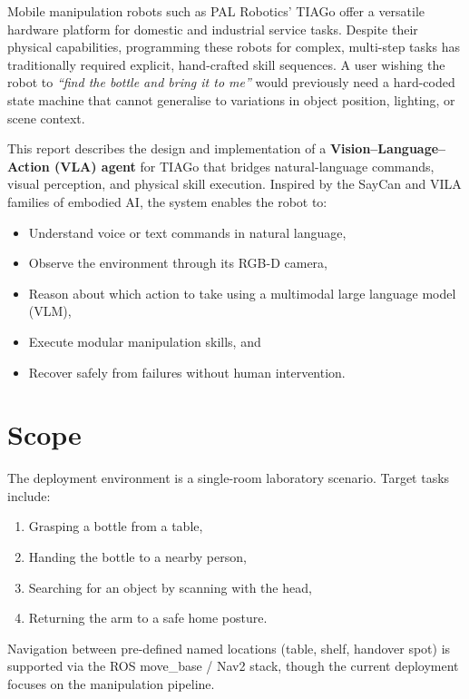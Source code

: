 \documentclass[12pt,a4paper]{report}
\begin{document}
Mobile manipulation robots such as PAL Robotics' TIAGo offer a versatile hardware platform
for domestic and industrial service tasks.  Despite their physical capabilities, programming
these robots for complex, multi-step tasks has traditionally required explicit, hand-crafted
skill sequences.  A user wishing the robot to \emph{``find the bottle and bring it to me''}
would previously need a hard-coded state machine that cannot generalise to variations in
object position, lighting, or scene context.

This report describes the design and implementation of a \textbf{Vision--Language--Action
(VLA) agent} for TIAGo that bridges natural-language commands, visual perception, and
physical skill execution.  Inspired by the SayCan \cite{saycancite} and VILA \cite{vilacite}
families of embodied AI, the system enables the robot to:

\begin{itemize}[noitemsep]
  \item Understand voice or text commands in natural language,
  \item Observe the environment through its RGB-D camera,
  \item Reason about which action to take using a multimodal large language model (VLM),
  \item Execute modular manipulation skills, and
  \item Recover safely from failures without human intervention.
\end{itemize}

\section{Scope}

The deployment environment is a single-room laboratory scenario.  Target tasks include:

\begin{enumerate}[noitemsep]
  \item Grasping a bottle from a table,
  \item Handing the bottle to a nearby person,
  \item Searching for an object by scanning with the head,
  \item Returning the arm to a safe home posture.
\end{enumerate}

Navigation between pre-defined named locations (table, shelf, handover spot) is supported
via the ROS move\_base / Nav2 stack, though the current deployment focuses on the
manipulation pipeline.
\end{document}
